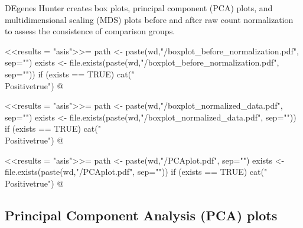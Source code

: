 \documentclass{article}
\begin{document}
DEgenes Hunter creates box plots, principal component (PCA) plots, and multidimensional scaling (MDS) plots before and after raw count normalization to assess the consistence of comparison groups. 


\newif\ifPositive

<<results = "asis">>=
path <- paste(wd,"/boxplot_before_normalization.pdf", sep="")
exists <- file.exists(paste(wd,"/boxplot_before_normalization.pdf", sep=""))
if (exists == TRUE) {
  cat("\\Positivetrue")
}
@

\ifPositive
\subsection{Box plots}
It is expected that samples belonging to the same treatment appear together at least after normalization, guarantying that the treatment groups to compare are sufficiently different.
\newline This is a boxplot before normalization of the count data (Image extracted from {\bf"boxplot\_before\_normalization.pdf"} file):
  \begin{center}
    \texttt{[image: \\Sexpr\{path]}}
  \end{center}
\fi




\newif\ifPositive

<<results = "asis">>=
path <- paste(wd,"/boxplot_normalized_data.pdf", sep="")
exists <- file.exists(paste(wd,"/boxplot_normalized_data.pdf", sep=""))
if (exists == TRUE) {
  cat("\\Positivetrue")
}
@

\ifPositive
This is a boxplot after normalization of the count data (Image extracted from {\bf"boxplot\_normalized\_data.pdf"} file):
  \begin{center}
    \texttt{[image: \\Sexpr\{path]}}
  \end{center}
\fi




\newif\ifPositive

<<results = "asis">>=
path <- paste(wd,"/PCAplot.pdf", sep="")
exists <- file.exists(paste(wd,"/PCAplot.pdf", sep=""))
if (exists == TRUE) {
  cat("\\Positivetrue")
}
@

\ifPositive
  \subsection{Principal Component Analysis (PCA) plots}
\end{document}

